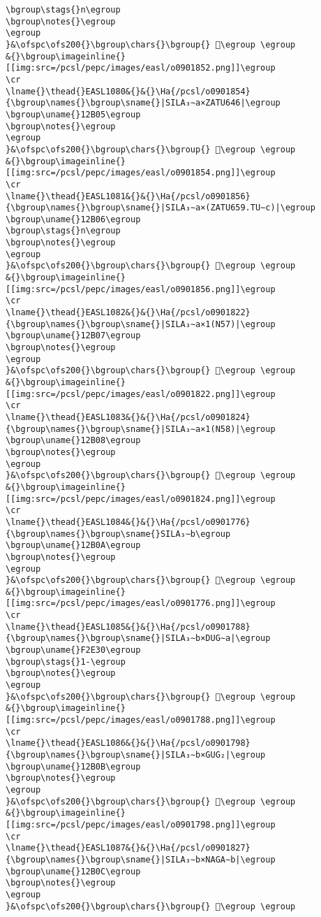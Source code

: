 \begin{verbatim}
\bgroup\stags{}n\egroup
\bgroup\notes{}\egroup
\egroup
}&\ofspc\ofs200{}\bgroup\chars{}\bgroup{} 𒬄\egroup \egroup
&{}\bgroup\imageinline{}[[img:src=/pcsl/pepc/images/easl/o0901852.png]]\egroup
\cr
\lname{}\thead{}EASL1080&{}&{}\Ha{/pcsl/o0901854}{\bgroup\names{}\bgroup\sname{}|SILA₃∼a×ZATU646|\egroup
\bgroup\uname{}12B05\egroup
\bgroup\notes{}\egroup
\egroup
}&\ofspc\ofs200{}\bgroup\chars{}\bgroup{} 𒬅\egroup \egroup
&{}\bgroup\imageinline{}[[img:src=/pcsl/pepc/images/easl/o0901854.png]]\egroup
\cr
\lname{}\thead{}EASL1081&{}&{}\Ha{/pcsl/o0901856}{\bgroup\names{}\bgroup\sname{}|SILA₃∼a×(ZATU659.TU∼c)|\egroup
\bgroup\uname{}12B06\egroup
\bgroup\stags{}n\egroup
\bgroup\notes{}\egroup
\egroup
}&\ofspc\ofs200{}\bgroup\chars{}\bgroup{} 𒬆\egroup \egroup
&{}\bgroup\imageinline{}[[img:src=/pcsl/pepc/images/easl/o0901856.png]]\egroup
\cr
\lname{}\thead{}EASL1082&{}&{}\Ha{/pcsl/o0901822}{\bgroup\names{}\bgroup\sname{}|SILA₃∼a×1(N57)|\egroup
\bgroup\uname{}12B07\egroup
\bgroup\notes{}\egroup
\egroup
}&\ofspc\ofs200{}\bgroup\chars{}\bgroup{} 𒬇\egroup \egroup
&{}\bgroup\imageinline{}[[img:src=/pcsl/pepc/images/easl/o0901822.png]]\egroup
\cr
\lname{}\thead{}EASL1083&{}&{}\Ha{/pcsl/o0901824}{\bgroup\names{}\bgroup\sname{}|SILA₃∼a×1(N58)|\egroup
\bgroup\uname{}12B08\egroup
\bgroup\notes{}\egroup
\egroup
}&\ofspc\ofs200{}\bgroup\chars{}\bgroup{} 𒬈\egroup \egroup
&{}\bgroup\imageinline{}[[img:src=/pcsl/pepc/images/easl/o0901824.png]]\egroup
\cr
\lname{}\thead{}EASL1084&{}&{}\Ha{/pcsl/o0901776}{\bgroup\names{}\bgroup\sname{}SILA₃∼b\egroup
\bgroup\uname{}12B0A\egroup
\bgroup\notes{}\egroup
\egroup
}&\ofspc\ofs200{}\bgroup\chars{}\bgroup{} 𒬊\egroup \egroup
&{}\bgroup\imageinline{}[[img:src=/pcsl/pepc/images/easl/o0901776.png]]\egroup
\cr
\lname{}\thead{}EASL1085&{}&{}\Ha{/pcsl/o0901788}{\bgroup\names{}\bgroup\sname{}|SILA₃∼b×DUG∼a|\egroup
\bgroup\uname{}F2E30\egroup
\bgroup\stags{}1-\egroup
\bgroup\notes{}\egroup
\egroup
}&\ofspc\ofs200{}\bgroup\chars{}\bgroup{} 󲸰\egroup \egroup
&{}\bgroup\imageinline{}[[img:src=/pcsl/pepc/images/easl/o0901788.png]]\egroup
\cr
\lname{}\thead{}EASL1086&{}&{}\Ha{/pcsl/o0901798}{\bgroup\names{}\bgroup\sname{}|SILA₃∼b×GUG₂|\egroup
\bgroup\uname{}12B0B\egroup
\bgroup\notes{}\egroup
\egroup
}&\ofspc\ofs200{}\bgroup\chars{}\bgroup{} 𒬋\egroup \egroup
&{}\bgroup\imageinline{}[[img:src=/pcsl/pepc/images/easl/o0901798.png]]\egroup
\cr
\lname{}\thead{}EASL1087&{}&{}\Ha{/pcsl/o0901827}{\bgroup\names{}\bgroup\sname{}|SILA₃∼b×NAGA∼b|\egroup
\bgroup\uname{}12B0C\egroup
\bgroup\notes{}\egroup
\egroup
}&\ofspc\ofs200{}\bgroup\chars{}\bgroup{} 𒬌\egroup \egroup

\end{verbatim}
